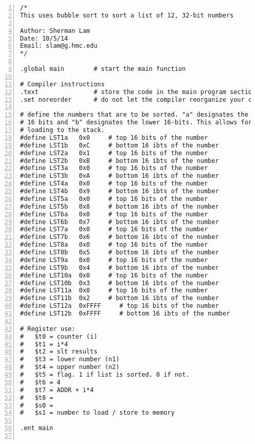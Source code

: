\documentclass[11pt]{article}
\begin{document}
\begin{lstlisting}[numbers=left,basicstyle=\footnotesize]
/*
This uses bubble sort to sort a list of 12, 32-bit numbers

Author: Sherman Lam
Date: 10/5/14
Email: slam@g.hmc.edu
*/

.global main        # start the main function

# Compiler instructions
.text               # store the code in the main program section of RAM
.set noreorder      # do not let the compiler reorganize your code

# define the numbers that are to be sorted. "a" designates the upper
# 16 bits and "b" designates the lower 16-bits. This allows for easy
# loading to the stack.
#define LST1a   0x0     # top 16 bits of the number
#define LST1b   0xC     # bottom 16 ibts of the number
#define LST2a   0x1     # top 16 bits of the number
#define LST2b   0xB     # bottom 16 ibts of the number
#define LST3a   0x0     # top 16 bits of the number
#define LST3b   0xA     # bottom 16 ibts of the number
#define LST4a   0x0     # top 16 bits of the number
#define LST4b   0x9     # bottom 16 ibts of the number
#define LST5a   0x0     # top 16 bits of the number
#define LST5b   0x8     # bottom 16 ibts of the number
#define LST6a   0x0     # top 16 bits of the number
#define LST6b   0x7     # bottom 16 ibts of the number
#define LST7a   0x0     # top 16 bits of the number
#define LST7b   0x6     # bottom 16 ibts of the number
#define LST8a   0x0     # top 16 bits of the number
#define LST8b   0x5     # bottom 16 ibts of the number
#define LST9a   0x0     # top 16 bits of the number
#define LST9b   0x4     # bottom 16 ibts of the number
#define LST10a  0x0     # top 16 bits of the number
#define LST10b  0x3     # bottom 16 ibts of the number
#define LST11a  0x0     # top 16 bits of the number
#define LST11b  0x2     # bottom 16 ibts of the number
#define LST12a  0xFFFF     # top 16 bits of the number
#define LST12b  0xFFFF     # bottom 16 ibts of the number

# Register use:
#   $t0 = counter (i)
#   $t1 = i*4
#   $t2 = slt results
#   $t3 = lower number (n1)
#   $t4 = upper number (n2)
#   $t5 = flag. 1 if list is sorted. 0 if not.
#   $t6 = 4
#   $t7 = ADDR + i*4
#   $t8 = 
#   $s0 = 
#   $s1 = number to load / store to memory

.ent main


\end{lstlisting}
\end{document}
